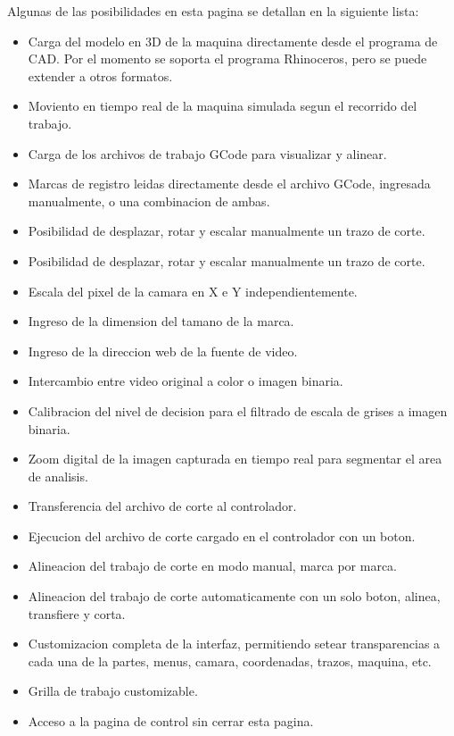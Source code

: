 Algunas de las posibilidades en esta pagina se detallan en la siguiente lista:
\begin{itemize}
   \item{Carga del modelo en 3D de la maquina directamente desde el programa de CAD. Por el momento se soporta el programa Rhinoceros, pero se puede extender a otros formatos. }
   \item{Moviento en tiempo real de la maquina simulada segun el recorrido del trabajo.}
   \item{Carga de los archivos de trabajo GCode para visualizar y alinear.}
   \item{Marcas de registro leidas directamente desde el archivo GCode, ingresada manualmente, o una combinacion de ambas.}
   \item{Posibilidad de desplazar, rotar y escalar manualmente un trazo de corte.}
   \item{Posibilidad de desplazar, rotar y escalar manualmente un trazo de corte.}

   \item{Escala del pixel de la camara en X e Y independientemente.}
   \item{Ingreso de la dimension del tamano de la marca.}
   \item{Ingreso de la direccion web de la fuente de video.}
   \item{Intercambio entre video original a color o imagen binaria.}
   \item{Calibracion del nivel de decision para el filtrado de escala de grises a imagen binaria.}
   \item{Zoom digital de la imagen capturada en tiempo real para segmentar el area de analisis.}
   \item{Transferencia del archivo de corte al controlador.}
   \item{Ejecucion del archivo de corte cargado en el controlador con un boton.}
   \item{Alineacion del trabajo de corte en modo manual, marca por marca.}
   \item{Alineacion del trabajo de corte automaticamente con un solo boton, alinea, transfiere y corta.}
   \item{Customizacion completa de la interfaz, permitiendo setear transparencias a cada una de la partes, menus, camara, coordenadas, trazos, maquina, etc.}
   \item{Grilla de trabajo customizable.}
   \item{Acceso a la pagina de control sin cerrar esta pagina.}
\end{itemize}



